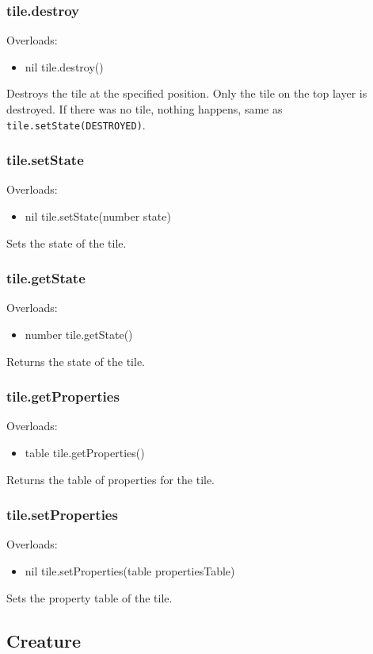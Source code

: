 \documentclass{book}
\newenvironment{ulist}
	{\begin{itemize}
			\itemsep0em}
	{\end{itemize}}
\begin{document}
\subsubsection{tile.destroy}
Overloads:
\begin{ulist}
	\item nil tile.destroy()
\end{ulist}
Destroys the tile at the specified position. Only the tile on the top layer is destroyed. If there was no tile, nothing happens, same as \texttt{tile.setState(DESTROYED)}.

\subsubsection{tile.setState}
Overloads:
\begin{ulist}
	\item nil tile.setState(number state)
\end{ulist}
Sets the state of the tile.

\subsubsection{tile.getState}
Overloads:
\begin{ulist}
	\item number tile.getState()
\end{ulist}
Returns the state of the tile.

\subsubsection{tile.getProperties}
Overloads:
\begin{ulist}
	\item table tile.getProperties()
\end{ulist}
Returns the table of properties for the tile.

\subsubsection{tile.setProperties}
Overloads:
\begin{ulist}
	\item nil tile.setProperties(table propertiesTable)
\end{ulist}
Sets the property table of the tile.

\subsection{Creature}
\end{document}
